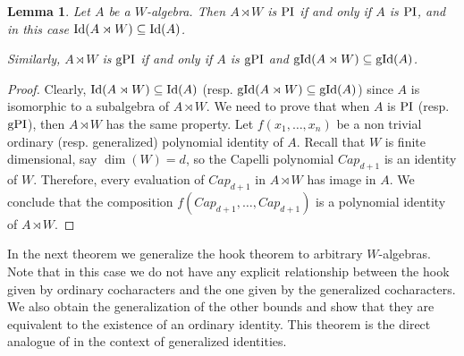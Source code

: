 \documentclass{article}
\newtheorem{lemma}[theorem]{Lemma}
\newcommand{\wa}{A\rtimes W}
\DeclareMathOperator{\gpi}{\textnormal{gPI}}
\DeclareMathOperator{\Polid}{\textnormal{PI}}
\DeclareMathOperator{\gid}{\textnormal{gId}}
\DeclareMathOperator{\id}{\textnormal{Id}}
\begin{document}
\begin{lemma}\label{lem: wa is PI}
	Let $A$ be a $W$-algebra. Then $\wa$ is $\Polid$ if and only if $A$ is $\Polid$, and in this case $\id(\wa)\subseteq \id(A)$. 
	
	Similarly, $\wa$ is $\gpi$ if and only if $A$ is $\gpi$ and $\gid(\wa)\subseteq \gid(A)$.
\end{lemma}
\begin{proof}
	Clearly, $\id(\wa)\subseteq \id(A)$ (resp. $\gid(\wa)\subseteq \gid(A)$) since $A$ is isomorphic to a subalgebra of $\wa$. We need to prove that when $A$ is $\Polid$ (resp. $\gpi$), then $\wa$ has the same property. Let $f(x_1,\dots,x_n)$ be a non trivial ordinary (resp. generalized) polynomial identity of $A$. Recall that $W$ is finite dimensional, say $\dim(W)=d$, so the Capelli polynomial $Cap_{d+1}$ is an identity of $W$. Therefore, every evaluation of $Cap_{d+1}$ in $\wa$ has image in $A$. We conclude that the composition $f(Cap_{d+1},\dots,Cap_{d+1})$ is a polynomial identity of $\wa$.
\end{proof}

In the next theorem we generalize the hook theorem to arbitrary $W$-algebras. Note that in this case we do not have any explicit relationship between the hook given by ordinary cocharacters and the one given by the generalized cocharacters. We also obtain the generalization of the other bounds and show that they are equivalent to the existence of an ordinary identity. This theorem is the direct analogue of \cite[Theorems 14, 29]{Ber96} in the context of generalized identities.
\end{document}
